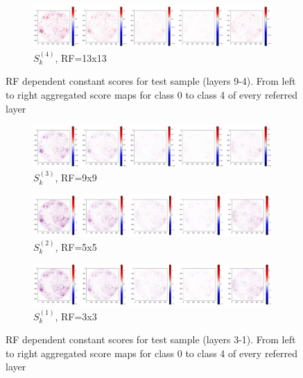 \documentclass[preprint]{elsarticle}
\theoremstyle{definition} %
\theoremstyle{remark}
\begin{document}
\begin{figure}[h!]
	\begin{subfigure}[b]{\textwidth}
		\includegraphics[width=\textwidth]{figures/score_prop_23713_left/score_k13.png}
		\caption{$S_k^{(4)}$, RF=13x13}
		\label{fig:score_k13}
	\end{subfigure}
	
	\caption{RF dependent constant scores for test sample (layers 9-4). From left to right aggregated score maps for class 0 to class 4 of every referred layer}
	\label{fig:test1_score_explanation2_k}
\end{figure}

\begin{figure}[h!]
	\centering
	\begin{subfigure}[b]{\textwidth}
		\includegraphics[width=\textwidth]{figures/score_prop_23713_left/score_k9.png}
		\caption{$S_k^{(3)}$, RF=9x9}
		\label{fig:score_k9}
	\end{subfigure}

	\begin{subfigure}[b]{\textwidth}
		\includegraphics[width=\textwidth]{figures/score_prop_23713_left/score_k5.png}
		\caption{$S_k^{(2)}$, RF=5x5}
		\label{fig:score_k5}
	\end{subfigure}
		
	\begin{subfigure}[b]{\textwidth}
	\includegraphics[width=\textwidth]{figures/score_prop_23713_left/score_k3.png}
	\caption{$S_k^{(1)}$, RF=3x3}
	\label{fig:score_k3}
\end{subfigure}

\caption{RF dependent constant scores for test sample (layers 3-1). From left to right aggregated score maps for class 0 to class 4 of every referred layer}
\label{fig:test1_score_explanation3_k}
\end{figure}
\end{document}
